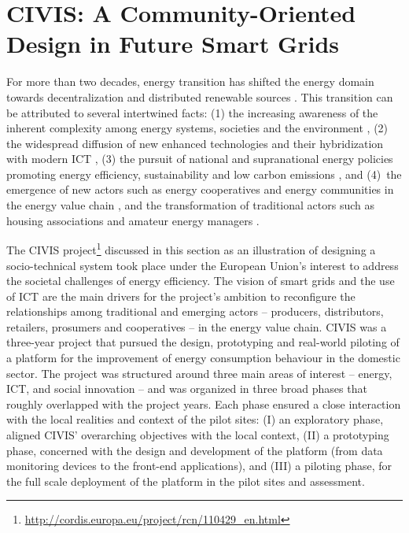 \section{CIVIS: A Community-Oriented Design in Future Smart Grids}
\label{sec:civis}

For more than two decades, energy transition has shifted the energy domain
towards decentralization and distributed renewable sources \cite{rifkin_third_2011,sovacool_how_2016}. This transition can be attributed to several intertwined facts: 
(1) the increasing awareness of the inherent complexity among energy systems, societies 
and the environment \cite{bulkeley_bringing_2012,umbach_global_2010}, (2) the
widespread diffusion of new enhanced technologies and their hybridization with modern ICT
\cite{putrus_smart_2013,schick_innovating_2013}, (3) the pursuit of national and 
supranational energy policies promoting energy efficiency, sustainability and low carbon emissions 
\cite{da_graca_carvalho_eu_2012}, and (4)~the emergence of new actors such as energy cooperatives and energy communities in the energy value chain \cite{viardot_role_2013}, and the 
transformation of traditional actors such as housing associations and amateur energy managers 
\cite{hasselqvist_linking_2016}.

The CIVIS project\footnote{\url{http://cordis.europa.eu/project/rcn/110429\_en.html}} discussed in this section as an illustration of designing a socio-technical system took place under the European Union's interest to address the societal challenges of energy efficiency. The vision of smart grids and the use of ICT are 
the main drivers for the project's ambition to reconfigure the relationships among traditional and 
emerging actors -- producers, distributors, retailers, 
prosumers and cooperatives -- in the energy value chain. CIVIS was a three-year project that pursued the design, prototyping and real-world piloting of 
a platform for the improvement of energy consumption behaviour in the domestic sector. The project was 
structured around three main areas of interest -- energy, ICT, and social innovation 
-- and was organized in three broad phases that roughly overlapped with the project years.
Each phase ensured a close interaction with the local realities and context of the pilot sites: (I) an 
exploratory phase, aligned CIVIS' overarching objectives with the local context,
(II) a prototyping phase, concerned with the design and development of the platform 
(from data monitoring devices to the front-end applications), and (III) a piloting 
phase, for the full scale deployment of the platform in the pilot sites and 
assessment.

